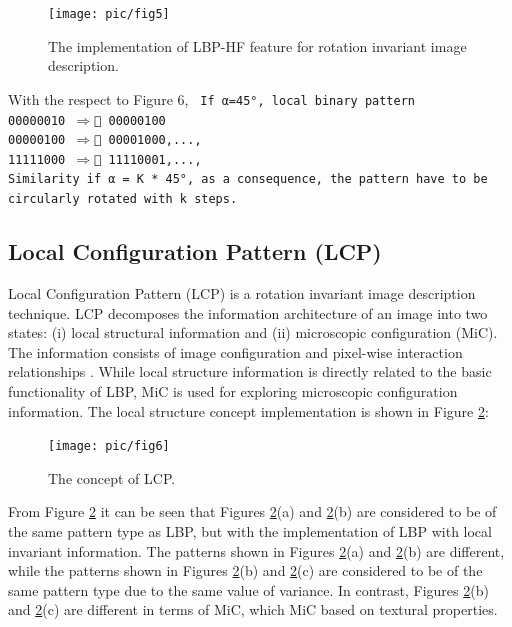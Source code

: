 \documentclass[review]{elsarticle}
\begin{document}
\begin{figure}[h]
	\centering
	\texttt{[image: pic/fig5]}
	\caption{The implementation of LBP-HF feature for rotation invariant image description.}
	\label{fig:LBP-HF}
\end{figure}

With the respect to Figure 6, 
\texttt{\noindent
	\newline\noindent
	If α=\ang{45}, local binary pattern\\
	\phantom{x}\hspace{10ex}00000010 $\Rightarrow$  00000100 \\
	\phantom{x}\hspace{10ex}00000100 $\Rightarrow$  00001000,...,\\
	\phantom{x}\hspace{10ex}11111000 $\Rightarrow$  11110001,...,\\
	Similarity if α = K * \ang{45}, as a consequence, the pattern have to be circularly rotated with k steps. \\
}




\subsection{Local Configuration Pattern (LCP)}
\label{subsec:LCP}
Local Configuration Pattern (LCP) is a rotation invariant image description technique. LCP decomposes the information architecture of an image into two states: (i) local structural information and (ii) microscopic configuration (MiC). The information consists of image configuration and pixel-wise interaction relationships \cite{Guo2011}. While local structure information is directly related to the basic functionality of LBP, MiC is used for exploring microscopic configuration information. The local structure concept implementation is shown in Figure \ref{fig:LCP}:

\begin{figure}[h!]
	\centering
	\texttt{[image: pic/fig6]}
	\caption{The concept of LCP.}
	\label{fig:LCP}
\end{figure} 

From Figure \ref{fig:LCP} it can be seen that Figures \ref{fig:LCP}(a) and \ref{fig:LCP}(b) are considered to be of the same pattern type as LBP, but with the implementation of LBP with local invariant information. The patterns shown in Figures \ref{fig:LCP}(a) and \ref{fig:LCP}(b) are different, while the patterns shown in Figures \ref{fig:LCP}(b) and \ref{fig:LCP}(c) are considered to be of the same pattern type due to the same value of variance. In contrast, Figures \ref{fig:LCP}(b) and \ref{fig:LCP}(c) are different in terms of MiC, which MiC based on textural properties. \\
\end{document}
